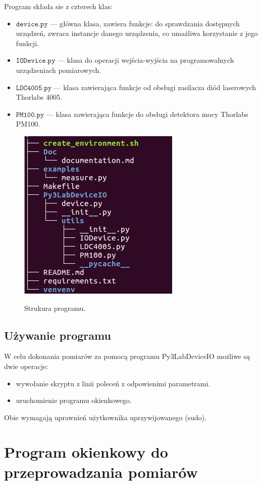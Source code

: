\documentclass[a4paper, portrait,12pt]{report}
\begin{document}
Program składa sie z czterech klas:
\begin{itemize}
\item $\mathtt{device.py}$ --- główna klasa, zawiera funkcje: do sprawdzania dostępnych urządzeń, 
zwraca instancje danego urządzenia, co umażliwa korzystanie z jego funkcji. 
\item $\mathtt{IODevice.py}$ --- klasa do operacji wejścia-wyjścia na programowalnych urządzeniach pomiarowych.
\item $\mathtt{LDC4005.py}$ --- klasa zawierająca funkcje od obsługi zasilacza diód laserowych Thorlabs 4005.
\item $\mathtt{PM100.py}$ --- klasa zawierająca funkcje do obsługi detektora mocy Thorlabs PM100.
\end{itemize}
\begin{figure}[h]
\center
  \includegraphics[scale=0.45]{tree.png}
  \label{rys1}
  \caption{Strukura programu.} 
\end{figure}
\section{Używanie programu}
W celu dokonania pomiarów za pomocą programu Py3LabDeviceIO możliwe są dwie operacje:
\begin{itemize}
\item wywołanie skryptu z linii poleceń z odpowienimi parametrami.
\item uruchomienie programu okienkowego.
\end{itemize}
Obie wymagają uprawnień użytkownika uprzywijowanego (sudo).
\newpage
\chapter{Program okienkowy do przeprowadzania pomiarów}
\end{document}
